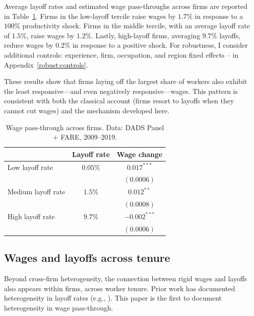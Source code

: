 Average layoff rates and estimated wage pass-throughs across firms are reported in Table~\ref{tab:acrossfirms}. Firms in the low-layoff tercile raise wages by $1.7\%$ in response to a $100\%$ productivity shock. Firms in the middle tercile, with an average layoff rate of $1.5\%$, raise wages by $1.2\%$. Lastly, high-layoff firms, averaging $9.7\%$ layoffs, reduce wages by $0.2\%$ in response to a positive shock. For robustness, I consider additional controls: experience, firm, occupation, and region fixed effects -- in Appendix~\ref{robust:controls}.

These results show that firms laying off the largest share of workers also exhibit the least responsive—and even negatively responsive—wages. This pattern is consistent with both the classical account (firms resort to layoffs when they cannot cut wages) and the mechanism developed here.

\begin{table}
  \centering
  \begin{tabular}{lcc}
    \hline
    & \multicolumn{1}{c}{Layoff rate} & \multicolumn{1}{c}{Wage change} \\
    \hline
    Low layoff rate    & $0.05\%$  &  $0.017^{***}$             \\
                       &           &  $(0.0006)$                \\
    Medium layoff rate & $1.5\%$   &  $0.012^{**}$              \\
                       &           &  $(0.0008)$                \\
    High layoff rate   & $9.7\%$   &  $-0.002^{***}$            \\
                       &           &  $(0.0006)$                \\
    \hline
  \end{tabular}
  \caption{Wage pass-through across firms. Data: DADS Panel + FARE, 2009–2019.}
  \label{tab:acrossfirms}
\end{table}

\subsection{Wages and layoffs across tenure}
Beyond cross-firm heterogeneity, the connection between rigid wages and layoffs also appears within firms, across worker tenure. Prior work has documented heterogeneity in layoff rates (e.g., \textcite{buhai2014}). This paper is the first to document heterogeneity in wage pass-through.

